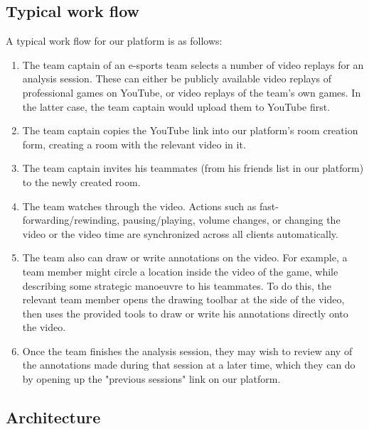 \documentclass[conference]{IEEEtran}
\begin{document}
\subsection{Typical work flow}

  A typical work flow for our platform is as follows:

  \begin{enumerate}
      \item The team captain of an e-sports team selects a number of video replays for an analysis session. These can either be publicly available video replays of professional games on YouTube, or video replays of the team's own games. In the latter case, the team captain would upload them to YouTube first.

      \item The team captain copies the YouTube link into our platform's room creation form, creating a room with the relevant video in it.

      \item The team captain invites his teammates (from his friends list in our platform) to the newly created room.

      \item The team watches through the video. Actions such as fast-forwarding/rewinding, pausing/playing, volume changes, or changing the video or the video time are synchronized across all clients automatically.

      \item The team also can draw or write annotations on the video. For example, a team member might circle a location inside the video of the game, while describing some strategic manoeuvre to his teammates. To do this, the relevant team member opens the drawing toolbar at the side of the video, then uses the provided tools to draw or write his annotations directly onto the video.

      \item Once the team finishes the analysis session, they may wish to review any of the annotations made during that session at a later time, which they can do by opening up the "previous sessions" link on our platform.
  \end{enumerate}

\subsection{Architecture}
\end{document}
